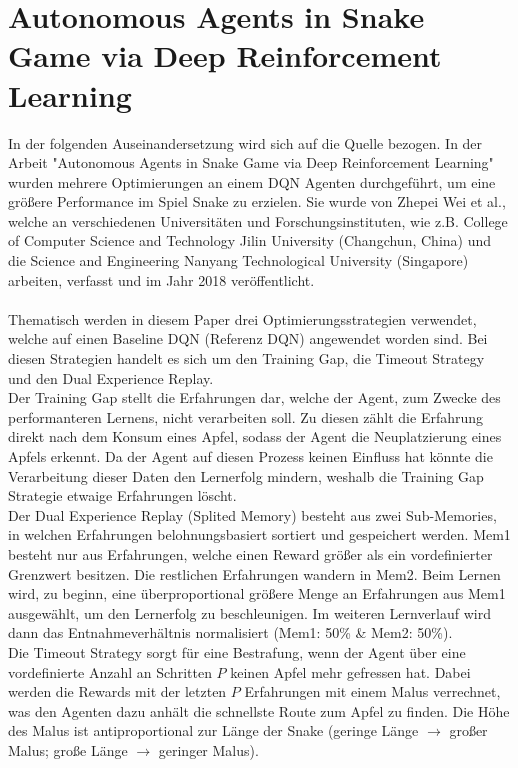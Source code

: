 \section{Autonomous Agents in Snake Game via Deep Reinforcement Learning} \label{sec:Paper_1}
In der folgenden Auseinandersetzung wird sich auf die Quelle \cite{Autonomous_Agents_in_Snake_Game_via_DRL} bezogen.
In der Arbeit "Autonomous Agents in Snake Game via Deep Reinforcement Learning" wurden mehrere Optimierungen an einem DQN Agenten durchgeführt, um eine größere Performance im Spiel Snake zu erzielen. Sie wurde von Zhepei Wei et al., welche an verschiedenen Universitäten und Forschungsinstituten, wie z.B. College of Computer Science and Technology Jilin University (Changchun, China) und die Science and Engineering Nanyang Technological University (Singapore) arbeiten, verfasst und im Jahr 2018 veröffentlicht.\\
\\Thematisch werden in diesem Paper drei Optimierungsstrategien verwendet, welche auf einen Baseline DQN (Referenz DQN) angewendet worden sind. Bei diesen Strategien handelt es sich um den Training Gap, die Timeout Strategy und den Dual Experience Replay.\\
Der Training Gap stellt die Erfahrungen dar, welche der Agent, zum Zwecke des performanteren Lernens, nicht verarbeiten soll. Zu diesen zählt die Erfahrung direkt nach dem Konsum eines Apfel, sodass der Agent die Neuplatzierung eines Apfels erkennt. Da der Agent auf diesen Prozess keinen Einfluss hat könnte die Verarbeitung dieser Daten den Lernerfolg mindern, weshalb die Training Gap Strategie etwaige Erfahrungen löscht.\\
Der Dual Experience Replay (Splited Memory) besteht aus zwei Sub-Memories, in welchen Erfahrungen belohnungsbasiert sortiert und gespeichert werden. Mem1 besteht nur aus Erfahrungen, welche einen Reward größer als ein vordefinierter Grenzwert besitzen. Die restlichen Erfahrungen wandern in Mem2. Beim Lernen wird, zu beginn, eine überproportional größere Menge an Erfahrungen aus Mem1 ausgewählt, um den Lernerfolg zu beschleunigen. Im weiteren Lernverlauf wird dann das Entnahmeverhältnis normalisiert (Mem1: 50\% \& Mem2: 50\%).\\
Die Timeout Strategy sorgt für eine Bestrafung, wenn der Agent über eine vordefinierte Anzahl an Schritten $P$ keinen Apfel mehr gefressen hat. Dabei werden die Rewards mit der letzten $P$ Erfahrungen mit einem Malus verrechnet, was den Agenten dazu anhält die schnellste Route zum Apfel zu finden. Die Höhe des Malus ist antiproportional zur Länge der Snake (geringe Länge $\rightarrow$ großer Malus; große Länge $\rightarrow$ geringer Malus).\\
